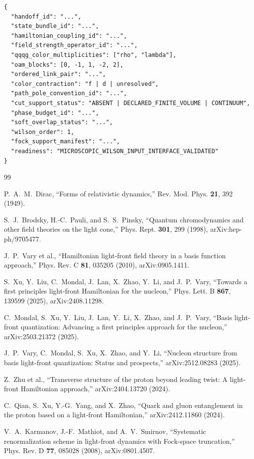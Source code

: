 \documentclass[11pt]{article}
\begin{document}
\begin{verbatim}
{
  "handoff_id": "...",
  "state_bundle_id": "...",
  "hamiltonian_coupling_id": "...",
  "field_strength_operator_id": "...",
  "qqqg_color_multiplicities": ["rho", "lambda"],
  "oam_blocks": [0, -1, 1, -2, 2],
  "ordered_link_pair": "...",
  "color_contraction": "f | d | unresolved",
  "path_pole_convention_id": "...",
  "cut_support_status": "ABSENT | DECLARED_FINITE_VOLUME | CONTINUUM",
  "phase_budget_id": "...",
  "soft_overlap_status": "...",
  "wilson_order": 1,
  "fock_support_manifest": "...",
  "readiness": "MICROSCOPIC_WILSON_INPUT_INTERFACE_VALIDATED"
}
\end{verbatim}

\small
\begin{thebibliography}{99}
\raggedright

P.~A.~M.~Dirac,
``Forms of relativistic dynamics,''
Rev. Mod. Phys. \textbf{21}, 392 (1949).

S.~J.~Brodsky, H.-C.~Pauli, and S.~S.~Pinsky,
``Quantum chromodynamics and other field theories on the light cone,''
Phys. Rept. \textbf{301}, 299 (1998),
arXiv:hep-ph/9705477.

J.~P.~Vary et al.,
``Hamiltonian light-front field theory in a basis function approach,''
Phys. Rev. C \textbf{81}, 035205 (2010),
arXiv:0905.1411.

S.~Xu, Y.~Liu, C.~Mondal, J.~Lan, X.~Zhao, Y.~Li, and J.~P.~Vary,
``Towards a first principles light-front Hamiltonian for the nucleon,''
Phys. Lett. B \textbf{867}, 139599 (2025),
arXiv:2408.11298.

C.~Mondal, S.~Xu, Y.~Liu, J.~Lan, Y.~Li, X.~Zhao, and J.~P.~Vary,
``Basis light-front quantization: Advancing a first principles approach for
the nucleon,''
arXiv:2503.21372 (2025).

J.~P.~Vary, C.~Mondal, S.~Xu, X.~Zhao, and Y.~Li,
``Nucleon structure from basis light-front quantization: Status and
prospects,''
arXiv:2512.08283 (2025).

Z.~Zhu et al.,
``Transverse structure of the proton beyond leading twist: A light-front
Hamiltonian approach,''
arXiv:2404.13720 (2024).

C.~Qian, S.~Xu, Y.-G.~Yang, and X.~Zhao,
``Quark and gluon entanglement in the proton based on a light-front
Hamiltonian,''
arXiv:2412.11860 (2024).

V.~A.~Karmanov, J.-F.~Mathiot, and A.~V.~Smirnov,
``Systematic renormalization scheme in light-front dynamics with Fock-space
truncation,''
Phys. Rev. D \textbf{77}, 085028 (2008),
arXiv:0801.4507.


\end{thebibliography}
\end{document}
